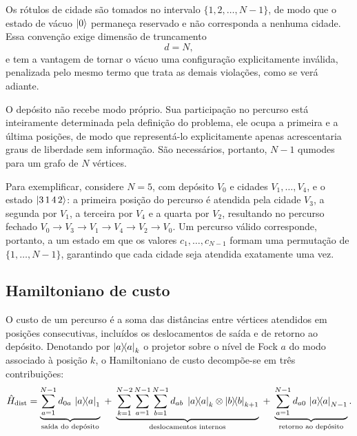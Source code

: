     Os rótulos de cidade são tomados no intervalo $\{1, 2, \dots, N-1\}$, de modo que o estado de vácuo $\ket{0}$ permaneça reservado e não corresponda a nenhuma cidade. Essa convenção exige dimensão de truncamento
    \begin{equation}\label{eq:cutoff_cod_posicional}
        d = N ,
    \end{equation}
    \noindent e tem a vantagem de tornar o vácuo uma configuração explicitamente inválida, penalizada pelo mesmo termo que trata as demais violações, como se verá adiante.

    O depósito não recebe modo próprio. Sua participação no percurso está inteiramente determinada pela definição do problema, ele ocupa a primeira e a última posições, de modo que representá-lo explicitamente apenas acrescentaria graus de liberdade sem informação. São necessários, portanto, $N-1$ qumodes para um grafo de $N$ vértices.

    Para exemplificar, considere $N = 5$, com depósito $V_0$ e cidades $V_1, \dots, V_4$, e o estado $\ket{3\,1\,4\,2}$: a primeira posição do percurso é atendida pela cidade $V_3$, a segunda por $V_1$, a terceira por $V_4$ e a quarta por $V_2$, resultando no percurso fechado $V_0 \rightarrow V_3 \rightarrow V_1 \rightarrow V_4 \rightarrow V_2 \rightarrow V_0$. Um percurso válido corresponde, portanto, a um estado em que os valores $c_1, \dots, c_{N-1}$ formam uma permutação de $\{1, \dots, N-1\}$, garantindo que cada cidade seja atendida exatamente uma vez.

    \subsection{Hamiltoniano de custo}\label{subsec:form_fock_custo}

        O custo de um percurso é a soma das distâncias entre vértices atendidos em posições consecutivas, incluídos os deslocamentos de saída e de retorno ao depósito. Denotando por $\ketbra{a}{a}_k$ o projetor sobre o nível de Fock $a$ do modo associado à posição $k$, o Hamiltoniano de custo decompõe-se em três contribuições:
        \begin{equation}\label{eq:form_fock_hdist}
            \hat{H}_{\text{dist}} =
            \underbrace{\sum_{a=1}^{N-1} d_{0a}\, \ketbra{a}{a}_1}_{\text{saída do depósito}}
            \;+\; \underbrace{\sum_{k=1}^{N-2} \sum_{a=1}^{N-1} \sum_{b=1}^{N-1}
            d_{ab}\; \ketbra{a}{a}_k \otimes \ketbra{b}{b}_{k+1}}_{\text{deslocamentos internos}}
            \;+\; \underbrace{\sum_{a=1}^{N-1} d_{a0}\, \ketbra{a}{a}_{N-1}}_{\text{retorno ao depósito}} .
        \end{equation}

